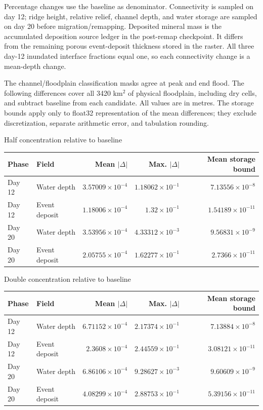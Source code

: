 Percentage changes use the baseline as denominator. Connectivity is
sampled on day 12; ridge height, relative relief, channel depth, and
water storage are sampled on day 20 before migration/remapping.
Deposited mineral mass is the accumulated deposition source ledger
in the post-remap checkpoint. It differs from the remaining porous
event-deposit thickness stored in the raster. All three day-12 inundated
interface fractions equal one, so each connectivity change is a
mean-depth change.

The channel/floodplain classification masks agree at peak and end
flood. The following differences cover all 3420 km$^2$ of physical
floodplain, including dry cells, and subtract baseline from each
candidate. All values are in metres. The storage bounds apply
only to float32 representation of the mean differences; they exclude
discretization, separate arithmetic error, and tabulation rounding.

\begin{center}\small\setlength{\tabcolsep}{4pt}
Half concentration relative to baseline\par\smallskip
\begin{tabular}{llrrr}
\toprule
Phase & Field & Mean $|\Delta|$ & Max. $|\Delta|$ & Mean storage bound \\
\midrule
Day 12 & Water depth & $3.57009\times10^{-4}$ & $1.18062\times10^{-1}$ & $7.13556\times10^{-8}$ \\
Day 12 & Event deposit & $1.18006\times10^{-4}$ & $1.32\times10^{-1}$ & $1.54189\times10^{-11}$ \\
Day 20 & Water depth & $3.53956\times10^{-4}$ & $4.33312\times10^{-3}$ & $9.56831\times10^{-9}$ \\
Day 20 & Event deposit & $2.05755\times10^{-4}$ & $1.62277\times10^{-1}$ & $2.7366\times10^{-11}$ \\
\bottomrule\end{tabular}\end{center}

\begin{center}\small\setlength{\tabcolsep}{4pt}
Double concentration relative to baseline\par\smallskip
\begin{tabular}{llrrr}
\toprule
Phase & Field & Mean $|\Delta|$ & Max. $|\Delta|$ & Mean storage bound \\
\midrule
Day 12 & Water depth & $6.71152\times10^{-4}$ & $2.17374\times10^{-1}$ & $7.13884\times10^{-8}$ \\
Day 12 & Event deposit & $2.3608\times10^{-4}$ & $2.44559\times10^{-1}$ & $3.08121\times10^{-11}$ \\
Day 20 & Water depth & $6.86106\times10^{-4}$ & $9.28627\times10^{-3}$ & $9.60609\times10^{-9}$ \\
Day 20 & Event deposit & $4.08299\times10^{-4}$ & $2.88753\times10^{-1}$ & $5.39156\times10^{-11}$ \\
\bottomrule\end{tabular}\end{center}

